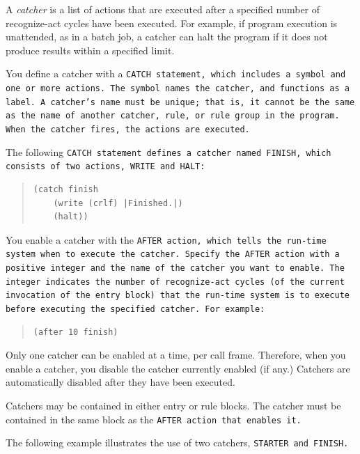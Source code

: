 A \emph{catcher} is a list of actions that are executed after a
specified number of recognize-act cycles have been executed. For
example, if program execution is unattended, as in a batch job, a
catcher can halt the program if it does not produce results within a
specified limit.

You define a catcher with a \tt{CATCH} statement, which includes a
symbol and one or more actions. The symbol names the catcher, and
functions as a label. A catcher's name must be unique; that is, it
cannot be the same as the name of another catcher, rule, or rule group
in the program. When the catcher fires, the actions are executed.

The following \tt{CATCH} statement defines a catcher named
\tt{FINISH}, which consists of two actions, \tt{WRITE} and \tt{HALT}:

\begin{quote}
\begin{verbatim}
(catch finish
    (write (crlf) |Finished.|)
    (halt))
\end{verbatim}
\end{quote}

You enable a catcher with the \tt{AFTER} action, which tells the
run-time system when to execute the catcher. Specify the \tt{AFTER}
action with a positive integer and the name of the catcher you want to
enable. The integer indicates the number of recognize-act cycles (of
the current invocation of the entry block) that the run-time system is
to execute before executing the specified catcher. For example:

\begin{quote}
\begin{verbatim}
(after 10 finish)
\end{verbatim}
\end{quote}

Only one catcher can be enabled at a time, per call frame. Therefore,
when you enable a catcher, you disable the catcher currently enabled
(if any.) Catchers are automatically disabled after they have been
executed.

Catchers may be contained in either entry or rule blocks. The catcher
must be contained in the same block as the \tt{AFTER} action that
enables it.

The following example illustrates the use of two catchers,
\tt{STARTER} and \tt{FINISH}.

